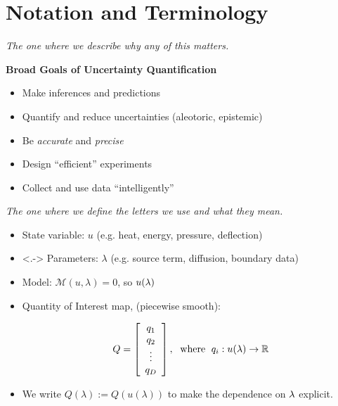 %


\section{Notation and Terminology}
\begin{frame}[t]{\it The one where we describe why any of this matters.}

{\bf Broad Goals of Uncertainty Quantification}

\medskip
    \begin{itemize}
	    \item Make inferences and predictions

			\bigskip
        \item Quantify and reduce uncertainties (aleotoric, epistemic)

			\bigskip
	    \item Be \emph{accurate} and \emph{precise}

			\bigskip
	    \item Design ``efficient'' experiments

			\bigskip
	    \item Collect and use data ``intelligently''
    \end{itemize}

\end{frame}

\begin{frame}[t]{\it The one where we define the letters we use and what they mean.}
\begin{itemize}
	\item State variable: $u$ {\color{gray}(e.g. heat, energy, pressure, deflection)}

	\bigskip
	\item<.-> Parameters: $\lambda$ {\color{gray}(e.g. source term, diffusion, boundary data)}

	\bigskip
		\item Model: $\mathcal{M} (u, \lambda) = 0$, so $u(\param)$

	\bigskip
	\item Quantity of Interest  map, (piecewise smooth):

		$$Q = \mat{c}{q_1\\ q_2\\ \vdots \\ q_\dimD}, \; \text{ where } \; q_i: u(\lambda) \to \RR$$

	\bigskip
	\item We write $Q(\lambda) := Q(u(\lambda))$ to make the dependence on $\param$ explicit.
\end{itemize}

\end{frame}


